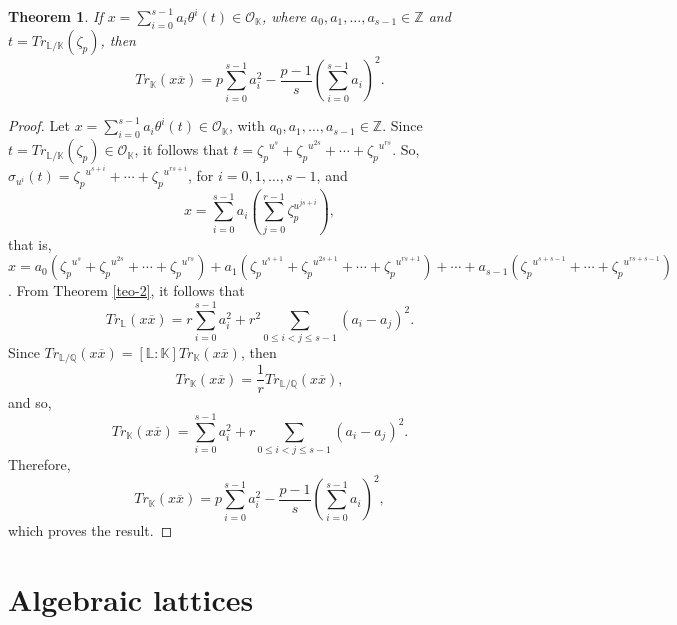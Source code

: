 \documentclass[10pt,a4paper]{amsart}
\newtheorem{theorem}{Theorem}
\begin{document}

\begin{theorem}\label{prop500} If $x=\displaystyle \sum_{i=0}^{s-1} a_i\theta^i(t) \in \mathcal{O}_{\mathbb{K}}$, where $a_0,a_1,\ldots,a_{s-1}\in\mathbb{Z}$ and $t=Tr_{\mathbb{L}/\mathbb{K}}(\zeta_p)$, then \[ Tr_{\mathbb{K}}(x\overline{x}) = p\sum_{i=0}^{s-1}a_i^2-\frac{p-1}{s}\left(\sum_{i=0}^{s-1}a_i\right)^2 . \] \end{theorem} 
\begin{proof} Let $x=\displaystyle \sum_{i=0}^{s-1} a_i\theta^i(t) \in \mathcal{O}_{\mathbb{K}}$, with $a_0,a_1,\ldots,a_{s-1}\in\mathbb{Z}$. Since $t=Tr_{\mathbb{L}/\mathbb{K}}(\zeta_p)\in \mathcal{O}_{\mathbb{K}}$, it follows that $t={\zeta_p}^{u^s}+{\zeta_p}^{u^{2s}}+\cdots+{\zeta_p}^{u^{rs}}$. So, $\sigma_{u^i}(t)={\zeta_p}^{u^{s+i}}+\cdots+{\zeta_p}^{u^{rs+i}}$, for $i=0,1,\ldots,s-1$, and
$$x = \sum_{i=0}^{s-1} a_i\left(\sum_{j=0}^{r-1}\zeta_p^{u^{js+i}} \right),$$ that is, $x=a_0({\zeta_p}^{u^s}+{\zeta_p}^{u^{2s}}+\cdots+{\zeta_p}^{u^{rs}})+a_1({\zeta_p}^{u^{s+1}}+{\zeta_p}^{u^{2s+1}}+\cdots+{\zeta_p}^{u^{rs+1}})+\cdots+a_{s-1}({\zeta_p}^{u^{s+s-1}}+\cdots+{\zeta_p}^{u^{rs+s-1}})$. 
From Theorem \ref{teo-2}, it follows that \[ Tr_{\mathbb{L}}(x\overline{x}) = r\sum_{i=0}^{s-1}a{_{i}^{2}} + {r^2}\sum_{0\leq i < j \leq s-1}^{}{(a_i - a_j)}^{2}. \] Since  $Tr_{\mathbb{L}/\mathbb{Q}}(x\overline{x}) = [\mathbb{L}:\mathbb{K}] Tr_{\mathbb{K}}(x\overline{x})$, then
$$Tr_{\mathbb{K}}(x\overline{x})=\frac{1}{r}Tr_{\mathbb{L}/\mathbb{Q}}(x\overline{x}),$$ and so, \[ Tr_{\mathbb{K}}(x\overline{x})=\sum_{i=0}^{s-1}a_{i}^{2} + r\sum_{0 \leq i < j \leq s-1}^{}{(a_i - a_j)}^{2}. \] Therefore, \[ Tr_{\mathbb{K}}(x\overline{x}) = p\sum_{i=0}^{s-1}a_i^2-\frac{p-1}{s} \left(\sum_{i=0}^{s-1}a_i\right)^2, \] which proves the result. \end{proof} 

\section{Algebraic lattices} \label{sec-4}
\end{document}
